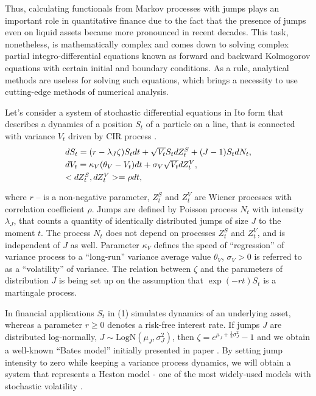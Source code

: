 \documentclass[a4paper]{jpconf}
\begin{document}
Thus, calculating functionals from Markov processes with jumps plays an important role in quantitative finance due to the fact that the presence of jumps even on liquid assets became more pronounced in recent decades. This task, nonetheless, is mathematically complex and comes down to solving complex partial integro-differential equations known as forward and backward Kolmogorov equations with certain initial and boundary conditions. As a rule, analytical methods are useless for solving such equations, which brings a necessity to use cutting-edge methods of numerical analysis.

Let's consider a system of stochastic differential equations in Ito form that describes a dynamics of a position $S_t$ of a particle on a line, that is connected with variance $V_t$ driven by CIR process \cite{cir}. 
\begin{equation}
\begin{array}{l}
dS_t = (r-\lambda_J \zeta)S_t dt+\sqrt{V_t} S_t dZ^S_t+(J-1) S_t dN_t,
\smallskip\\
dV_t= \kappa_V(\theta_V-V_t)dt+\sigma_V\sqrt{V_t}dZ^V_t,
\smallskip\\
<dZ^S_t,dZ^V_t> = \rho dt,
\smallskip\\
\end{array}
\end{equation}
where $r$ -- is a non-negative parameter, $Z^S_t$ and $Z^V_t$ are Wiener processes with correlation coefficient $\rho$. Jumps are defined by Poisson process $N_t$ with intensity $\lambda_J$, that counts a quantity of identically distributed jumps of size $J$ to the moment $t$. The process $N_t$ does not depend on processes $Z^S_t$ and $Z^V_t$, and is independent of $J$ as well. Parameter $\kappa_V$ defines the speed of ``regression'' of variance process to a ``long-run'' variance average value $\theta_V$, $\sigma_V>0$ is referred to as a ``volatility'' of variance. The relation between $\zeta$ and the parameters of distribution $J$  is being set up on the assumption that $\exp(-rt)S_t$ is a martingale process. 

In financial applications $S_t$ in (1) simulates dynamics of an underlying asset, whereas a parameter $r \ge 0$ denotes a risk-free interest rate. If jumps $J$ are distributed log-normally, $J\sim \mbox{LogN}(\mu_J, \sigma_J^2)$, then $\zeta = e^{\mu_J + \frac{1}{2}\sigma_J^2} - 1$ and we obtain a well-known ``Bates model'' initially presented in paper \cite{bates}. By setting jump intensity to zero while keeping a variance process dynamics, we will obtain a system that represents a Heston model - one of the most widely-used models with stochastic volatility \cite{heston}.
\end{document}
